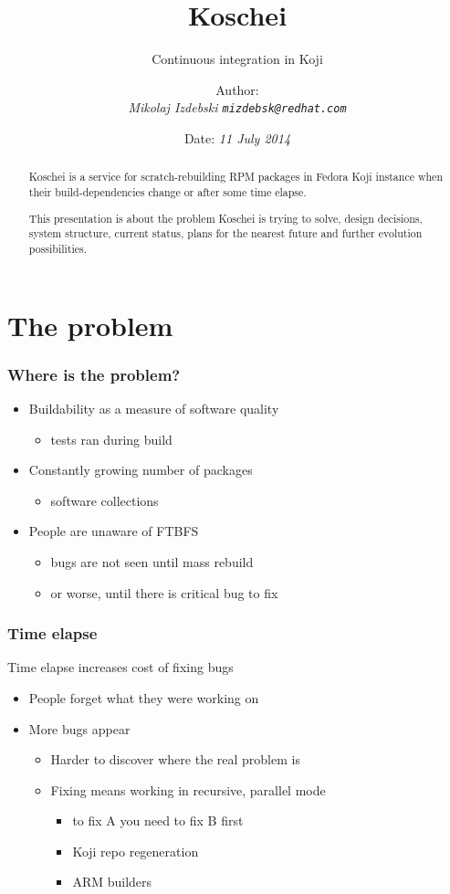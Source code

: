 \documentclass[pdftex,unicode,xcolor=table]{beamer}
\title{Koschei}
\subtitle{Continuous integration in Koji}
\author{Author: \\
  \em{Mikolaj Izdebski}
  \tt{mizdebsk@redhat.com}}
\date{Date: \em{11 July 2014}}
\begin{document}
\begin{rhbg}
  \begin{frame}
    \titlepage
    \begin{abstract}
Koschei is a service for scratch-rebuilding RPM packages in Fedora Koji
instance when their build-dependencies change or after some time elapse.

This presentation is about the problem Koschei is trying to solve, design decisions,
system structure, current status, plans for the nearest future and further
evolution possibilities.
    \end{abstract}
  \end{frame}
\end{rhbg}


\section{The problem}
\Large
\begin{frame}
  \frametitle{Where is the problem?}
  \begin{itemize}
  \item Buildability as a measure of software quality
    \begin{itemize}
      \item tests ran during build
    \end{itemize}
  \item Constantly growing number of packages
    \begin{itemize}
      \item software collections
    \end{itemize}
  \item People are unaware of FTBFS
    \begin{itemize}
      \item bugs are not seen until mass rebuild
      \item or worse, until there is critical bug to fix
    \end{itemize}
  \end{itemize}
\end{frame}

\begin{frame}
  \frametitle{Time elapse}
  Time elapse increases cost of fixing bugs
  \begin{itemize}
  \item People forget what they were working on
  \item More bugs appear
    \begin{itemize}
      \item Harder to discover where the real problem is
      \item Fixing means working in recursive, parallel mode
      \begin{itemize}
        \item to fix A you need to fix B first
        \item Koji repo regeneration
        \item ARM builders
      \end{itemize}
    \end{itemize}
  \end{itemize}
\end{frame}
\end{document}
